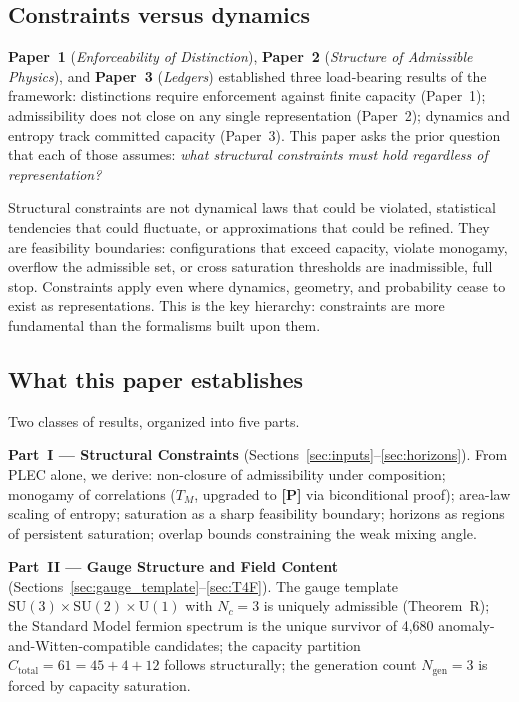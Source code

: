 \documentclass[11pt]{article}
\newcommand{\SU}{\mathrm{SU}}
\newcommand{\Un}{\mathrm{U}}
\newcommand{\epitag}[1]{\textbf{[#1]}}
\newcommand{\paperref}[2]{\textbf{Paper~#1} (\textit{#2})}
\theoremstyle{definition}
\begin{document}
\subsection{Constraints versus dynamics}\label{sec:intro_constraints_vs_dynamics}

\paperref{1}{Enforceability of Distinction}, \paperref{2}{Structure of Admissible Physics}, and \paperref{3}{Ledgers} established three load-bearing results of the framework: distinctions require enforcement against finite capacity (Paper~1); admissibility does not close on any single representation (Paper~2); dynamics and entropy track committed capacity (Paper~3). This paper asks the prior question that each of those assumes: \emph{what structural constraints must hold regardless of representation?}

Structural constraints are not dynamical laws that could be violated, statistical tendencies that could fluctuate, or approximations that could be refined. They are feasibility boundaries: configurations that exceed capacity, violate monogamy, overflow the admissible set, or cross saturation thresholds are inadmissible, full stop. Constraints apply even where dynamics, geometry, and probability cease to exist as representations. This is the key hierarchy: constraints are more fundamental than the formalisms built upon them.

\subsection{What this paper establishes}\label{sec:intro_what_paper_establishes}

Two classes of results, organized into five parts.

\textbf{Part~I --- Structural Constraints} (Sections~\ref{sec:inputs}--\ref{sec:horizons}). From PLEC alone, we derive: non-closure of admissibility under composition; monogamy of correlations ($T_M$, upgraded to \epitag{P} via biconditional proof); area-law scaling of entropy; saturation as a sharp feasibility boundary; horizons as regions of persistent saturation; overlap bounds constraining the weak mixing angle.

\textbf{Part~II --- Gauge Structure and Field Content} (Sections~\ref{sec:gauge_template}--\ref{sec:T4F}). The gauge template $\SU(3)\times\SU(2)\times\Un(1)$ with $N_c = 3$ is uniquely admissible (Theorem~R); the Standard Model fermion spectrum is the unique survivor of 4{,}680 anomaly-and-Witten-compatible candidates; the capacity partition $C_{\mathrm{total}} = 61 = 45 + 4 + 12$ follows structurally; the generation count $N_{\mathrm{gen}} = 3$ is forced by capacity saturation.
\end{document}
